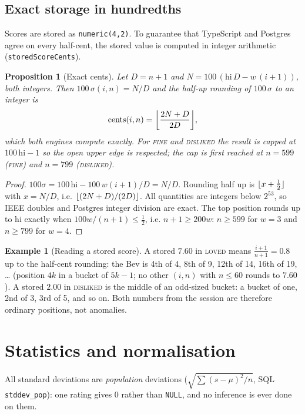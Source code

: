 \documentclass[11pt]{article}
\DeclarePairedDelimiter\floor{\lfloor}{\rfloor}
\newcommand{\code}[1]{\texttt{#1}}
\theoremstyle{plain}
\newtheorem{proposition}[theorem]{Proposition}
\theoremstyle{definition}
\newtheorem{example}[theorem]{Example}
\theoremstyle{remark}
\begin{document}
\subsection{Exact storage in hundredths}

Scores are stored as \code{numeric(4,2)}. To guarantee that TypeScript and Postgres agree on every half-cent, the stored value is computed in integer arithmetic (\code{storedScoreCents}).

\begin{proposition}[Exact cents]\label{prop:cents}
Let $D = n + 1$ and $N = 100\,(\mathrm{hi}\, D - w\,(i+1))$, both integers. Then $100\,\sigma(i, n) = N / D$ and the half-up rounding of $100\,\sigma$ to an integer is
\[
\mathrm{cents}(i, n) = \floor*{\frac{2N + D}{2D}},
\]
which both engines compute exactly. For \textsc{fine} and \textsc{disliked} the result is capped at $100\,\mathrm{hi} - 1$ so the open upper edge is respected; the cap is first reached at $n = 599$ (\textsc{fine}) and $n = 799$ (\textsc{disliked}).
\end{proposition}
\begin{proof}
$100\sigma = 100\,\mathrm{hi} - 100\,w(i+1)/D = N/D$. Rounding half up is $\floor{x + \tfrac12}$ with $x = N/D$, i.e. $\floor{(2N + D)/(2D)}$. All quantities are integers below $2^{53}$, so IEEE doubles and Postgres integer division are exact. The top position rounds up to $\mathrm{hi}$ exactly when $100 w/(n+1) \le \tfrac12$, i.e. $n + 1 \ge 200 w$: $n \ge 599$ for $w = 3$ and $n \ge 799$ for $w = 4$.
\end{proof}

\begin{example}[Reading a stored score]\label{ex:76}
A stored $7.60$ in \textsc{loved} means $\frac{i+1}{n+1} = 0.8$ up to the half-cent rounding: the Bev is 4th of 4, 8th of 9, 12th of 14, 16th of 19, \dots{} (position $4k$ in a bucket of $5k - 1$; no other $(i, n)$ with $n \le 60$ rounds to $7.60$). A stored $2.00$ in \textsc{disliked} is the middle of an odd-sized bucket: a bucket of one, 2nd of 3, 3rd of 5, and so on. Both numbers from the session are therefore ordinary positions, not anomalies.
\end{example}

\section{Statistics and normalisation}\label{sec:stats}

All standard deviations are \emph{population} deviations ($\sqrt{\sum (s - \mu)^2 / n}$, SQL \code{stddev\_pop}): one rating gives $0$ rather than \code{NULL}, and no inference is ever done on them.
\end{document}
